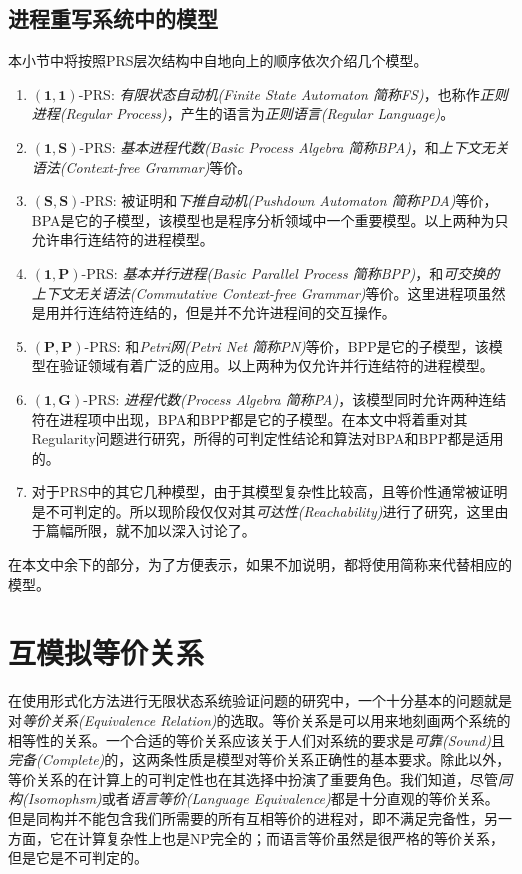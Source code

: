 \subsection{进程重写系统中的模型}
\label{subsec:models}

本小节中将按照PRS层次结构中自地向上的顺序依次介绍几个模型。
\begin{enumerate}
	\item $(\mathbf{1},\mathbf{1})$-PRS: \emph{有限状态自动机(Finite State Automaton 简称FS)}，也称作\emph{正则进程(Regular Process)}，产生的语言为\emph{正则语言(Regular Language)}。
	\item $(\mathbf{1},\mathbf{S})$-PRS: \emph{基本进程代数(Basic Process Algebra 简称BPA)}，和\emph{上下文无关语法(Context-free Grammar)}等价。
	\item $(\mathbf{S},\mathbf{S})$-PRS: 被证明和\emph{下推自动机(Pushdown Automaton 简称PDA)}等价，BPA是它的子模型，该模型也是程序分析领域中一个重要模型。以上两种为只允许串行连结符的进程模型。
	\item $(\mathbf{1},\mathbf{P})$-PRS: \emph{基本并行进程(Basic Parallel Process 简称BPP)}，和\emph{可交换的上下文无关语法(Commutative Context-free Grammar)}等价。这里进程项虽然是用并行连结符连结的，但是并不允许进程间的交互操作。
	\item $(\mathbf{P},\mathbf{P})$-PRS: 和\emph{Petri网(Petri Net 简称PN)}等价，BPP是它的子模型，该模型在验证领域有着广泛的应用。以上两种为仅允许并行连结符的进程模型。
	\item $(\mathbf{1},\mathbf{G})$-PRS: \emph{进程代数(Process Algebra 简称PA)}，该模型同时允许两种连结符在进程项中出现，BPA和BPP都是它的子模型。在本文中将着重对其Regularity问题进行研究，所得的可判定性结论和算法对BPA和BPP都是适用的。
	\item 对于PRS中的其它几种模型，由于其模型复杂性比较高，且等价性通常被证明是不可判定的。所以现阶段仅仅对其\emph{可达性(Reachability)}进行了研究，这里由于篇幅所限，就不加以深入讨论了。
\end{enumerate}
在本文中余下的部分，为了方便表示，如果不加说明，都将使用简称来代替相应的模型。

\section{互模拟等价关系}
\label{sec:bis}

在使用形式化方法进行无限状态系统验证问题的研究中，一个十分基本的问题就是对\emph{等价关系(Equivalence Relation)}的选取。等价关系是可以用来地刻画两个系统的相等性的关系。一个合适的等价关系应该关于人们对系统的要求是\emph{可靠(Sound)}且\emph{完备(Complete)}的，这两条性质是模型对等价关系正确性的基本要求。除此以外，等价关系的在计算上的可判定性也在其选择中扮演了重要角色。我们知道，尽管\emph{同构(Isomophsm)}或者\emph{语言等价(Language Equivalence)}都是十分直观的等价关系。但是同构并不能包含我们所需要的所有互相等价的进程对，即不满足完备性，另一方面，它在计算复杂性上也是NP完全的；而语言等价虽然是很严格的等价关系，但是它是不可判定的\cite{Hopcroft1979}。

